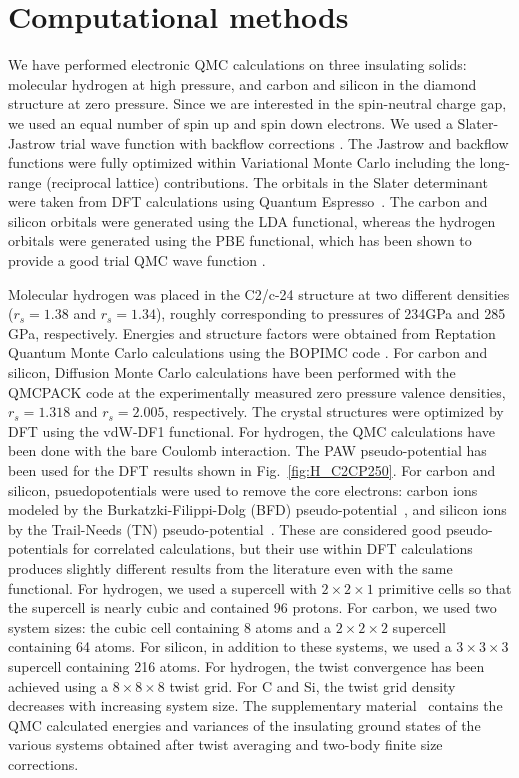 \section{Computational methods\label{sec:bg-methods}}

We have performed electronic QMC calculations on three insulating solids:
molecular hydrogen at high pressure,
and carbon and silicon in the diamond structure at zero pressure. Since we are interested in the
spin-neutral charge gap, we used an equal number of spin up and spin down electrons. We used a Slater-Jastrow  trial wave function with backflow corrections \cite{Holzmann2003,Trial}. The Jastrow and backflow functions were fully optimized within Variational Monte Carlo including the long-range (reciprocal lattice) contributions.
The orbitals in the Slater determinant were taken from DFT calculations using Quantum Espresso~\cite{QE2009, QE2017}. The carbon and silicon orbitals were generated using the LDA functional, whereas the hydrogen orbitals were generated using the PBE functional, which has been shown to provide a good trial QMC wave function \cite{Morales2012,Pierleoni2016}.

Molecular hydrogen was placed in the C2/c-24 structure \cite{Pickard2007} at two different densities ($r_s=1.38$ and $r_s=1.34$), roughly corresponding to pressures of 234GPa and 285 GPa, respectively.
Energies and structure factors were obtained from Reptation Quantum Monte Carlo calculations using the BOPIMC code \cite{BOPIMC}. For carbon and silicon, Diffusion Monte Carlo calculations have been performed with the QMCPACK code \cite{QMCPACK}
at the experimentally measured zero pressure valence densities, $r_s=1.318$ and $r_s=2.005$, respectively.
The crystal structures were optimized by DFT using the vdW-DF1 functional.
For hydrogen, the QMC calculations have been done with the bare Coulomb interaction. The PAW pseudo-potential has been used for the DFT results shown in Fig.~\ref{fig:H_C2CP250}. For carbon and silicon, psuedopotentials were used to remove the core electrons: carbon ions modeled by the Burkatzki-Filippi-Dolg (BFD) pseudo-potential~\cite{Burkatzki2007}, and silicon ions by the Trail-Needs (TN) pseudo-potential~\cite{Trail2005}. These are considered good pseudo-potentials for correlated calculations, but their use within DFT calculations produces slightly different results from the literature even with the same functional.
For hydrogen, we used a supercell with  $2 \times 2 \times 1$ primitive cells so that the supercell is nearly cubic and contained 96 protons. For carbon, we used two system sizes: the cubic cell containing 8 atoms and a $2\times 2\times 2$ supercell containing 64 atoms. For silicon, in addition to these systems, we used a $3\times 3\times 3$ supercell containing 216 atoms.
For hydrogen, the twist convergence has been achieved using a $8 \times 8 \times 8$ twist grid. For C and Si, the twist grid density decreases with increasing system size. The supplementary material~\cite{supp} contains the QMC calculated energies and variances of the insulating ground states
of the various systems obtained after twist averaging and two-body finite size corrections.

